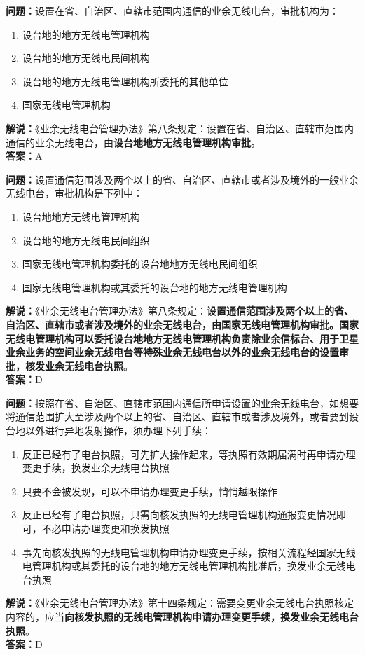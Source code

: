 \bigskip


\noindent\textbf{问题：}设置在省、自治区、直辖市范围内通信的业余无线电台，审批机构为：
\begin{enumerate}[label=\Alph*), leftmargin=3em]
	\item 设台地的地方无线电管理机构
	\item 设台地的地方无线电民间机构
	\item 设台地的地方无线电管理机构所委托的其他单位
	\item 国家无线电管理机构
\end{enumerate}
\noindent\textbf{解说：}《业余无线电台管理办法》第八条规定：设置在省、自治区、直辖市范围内通信的业余无线电台，由\textbf{设台地地方无线电管理机构审批}。\\\noindent\textbf{答案：}A


\bigskip


\noindent\textbf{问题：}设置通信范围涉及两个以上的省、自治区、直辖市或者涉及境外的一般业余无线电台，审批机构是下列中：
\begin{enumerate}[label=\Alph*), leftmargin=3em]
	\item 设台地地方无线电管理机构
	\item 设台地的地方无线电民间组织
	\item 国家无线电管理机构委托的设台地地方无线电民间组织
	\item 国家无线电管理机构或其委托的设台地的地方无线电管理机构
\end{enumerate}
\noindent\textbf{解说：}《业余无线电台管理办法》第八条规定：\textbf{设置通信范围涉及两个以上的省、自治区、直辖市或者涉及境外的业余无线电台，由国家无线电管理机构审批。国家无线电管理机构可以委托设台地地方无线电管理机构负责除业余信标台、用于卫星业余业务的空间业余无线电台等特殊业余无线电台以外的业余无线电台的设置审批，核发业余无线电台执照}。\\\noindent\textbf{答案：}D


\bigskip


\noindent\textbf{问题：}按照在省、自治区、直辖市范围内通信所申请设置的业余无线电台，如想要将通信范围扩大至涉及两个以上的省、自治区、直辖市或者涉及境外，或者要到设台地以外进行异地发射操作，须办理下列手续：
\begin{enumerate}[label=\Alph*), leftmargin=3em]
	\item 反正已经有了电台执照，可先扩大操作起来，等执照有效期届满时再申请办理变更手续，换发业余无线电台执照
	\item 只要不会被发现，可以不申请办理变更手续，悄悄越限操作
	\item 反正已经有了电台执照，只需向核发执照的无线电管理机构通报变更情况即可，不必申请办理变更和换发执照
	\item 事先向核发执照的无线电管理机构申请办理变更手续，按相关流程经国家无线电管理机构或其委托的设台地的地方无线电管理机构批准后，换发业余无线电台执照
\end{enumerate}
\noindent\textbf{解说：}《业余无线电台管理办法》第十四条规定：需要变更业余无线电台执照核定内容的，应当\textbf{向核发执照的无线电管理机构申请办理变更手续，换发业余无线电台执照}。\\\noindent\textbf{答案：}D



